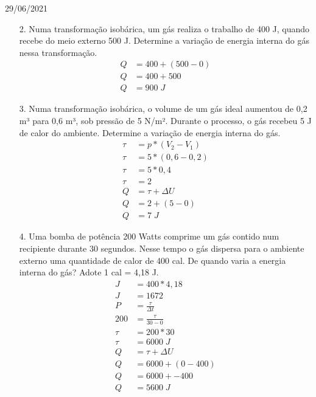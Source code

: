 \documentclass{SchoolBook}
\begin{document}
    \begin{day}{29/06/2021}
        \begin{enumerate}
            \item[2.] Numa transformação isobárica, um gás realiza o trabalho de 400 J, quando recebe do meio externo 500 J. Determine a variação de energia interna do gás nessa transformação.
            \begin{align*}
                Q &= 400 + (500 - 0) \\
                Q &= 400 + 500       \\
                Q &= 900\;J
            \end{align*}
            
            \item[3.] Numa transformação isobárica, o volume de um gás ideal aumentou de 0,2 m³ para 0,6 m³, sob pressão de 5 N/m². Durante o processo, o gás recebeu 5 J de calor do ambiente. Determine a variação de energia interna do gás.
            \begin{align*}
                \tau &= p * (V_2 - V_1) \\
                \tau &= 5 * (0,6 - 0,2) \\
                \tau &= 5 * 0,4         \\
                \tau &= 2               \\[3pt]
                   Q &= \tau + \Delta U \\
                   Q &= 2 + (5 - 0)     \\
                   Q &= 7\;J
            \end{align*}
            
            \item[4.] Uma bomba de potência 200 Watts comprime um gás contido num recipiente durante 30 segundos. Nesse tempo o gás dispersa para o ambiente externo uma quantidade de calor de 400 cal. De quando varia a energia interna do gás? Adote 1 cal = 4,18 J.
            \begin{align*}
                   J &= 400 * 4,18 \\
                   J &= 1672       \\[3pt]
                   P &= \frac{\tau}{\Delta t} \\
                 200 &= \frac{\tau}{30 - 0}   \\
                \tau &= 200 * 30              \\
                \tau &= 6000\;J               \\[3pt]
                   Q &= \tau + \Delta U  \\
                   Q &= 6000 + (0 - 400) \\
                   Q &= 6000 + -400      \\
                   Q &= 5600\;J
            \end{align*}
            

\end{enumerate}
\end{day}
\end{document}
